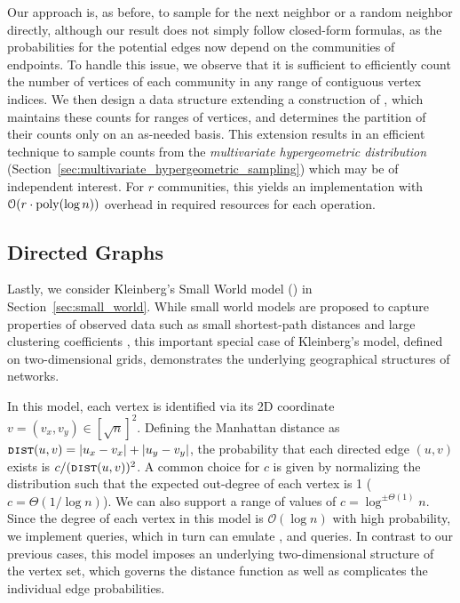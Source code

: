 Our approach is, as before, to sample for the next neighbor or a random neighbor directly,
although our result does not simply follow closed-form formulas,
as the probabilities for the potential edges now depend on the communities of endpoints.
To handle this issue, we observe that it is sufficient to efficiently count
the number of vertices of each community in any range of contiguous vertex indices.
We then design a data structure extending a construction of \cite{huge}, which maintains these counts for ranges of vertices,
and determines the partition of their counts only on an as-needed basis.
This extension results in an efficient technique to sample counts from the \emph{multivariate hypergeometric distribution}
(Section~\ref{sec:multivariate_hypergeometric_sampling}) which may be of independent interest.
For $r$ communities, this yields an implementation with $ \mathcal{O}(r\cdot \mathrm{poly}(\log n))$ overhead in required resources for each operation.




\subsection{Directed Graphs}
\label{sec:directed_graphs}
Lastly, we consider Kleinberg's Small World model (\cite{kleinberg, klein}) in Section~\ref{sec:small_world}.
While small world models are proposed to capture properties of observed data such as small shortest-path
distances and large clustering coefficients \cite{watts1998collective},
this important special case of Kleinberg's model, defined on two-dimensional grids, demonstrates the underlying geographical structures of networks.

In this model, each vertex is identified via its 2D coordinate $v = (v_x, v_y) \in [\sqrt{n}]^2$.
Defining the Manhattan distance as $\texttt{\textsc{dist}}(u,v)=|u_x-v_x|+|u_y-v_y|$,
the probability that each directed edge $(u,v)$ exists is $c/(\texttt{\textsc{dist}}(u,v))^{2}$.
A common choice for $c$ is given by normalizing the distribution such that the expected out-degree of each vertex is 1 ($c = \Theta(1/\log n)$).
We can also support a range of values of $c=\log^{\pm\Theta(1)}n$.
Since the degree of each vertex in this model is $\mathcal O(\log n)$ with high probability, we implement  queries,
which in turn can emulate ,  and  queries.
In contrast to our previous cases, this model imposes an underlying two-dimensional structure of the vertex set,
which governs the distance function as well as complicates the individual edge probabilities.

